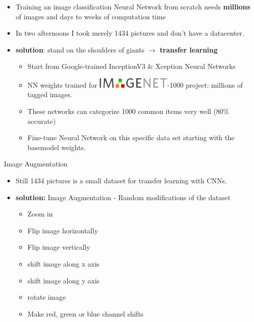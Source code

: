 \documentclass{beamer}
\begin{document}
\begin{frame}
\begin{itemize}
 \item Training an image classification Neural Network from scratch needs \textbf{millions} of images and days to weeks of computation time 
 \item In two afternoons I took merely 1434 pictures and don't have a datacenter.
 \item \textbf{solution}: stand on the shoulders of giants $\rightarrow$ \textbf{transfer learning}
  \begin{itemize}
    \item Start from Google-trained InceptionV3 \& Xception Neural Networks
    \item NN weights trained for \includegraphics[width=0.3\textwidth]{imagenet.jpg}-1000 project: millions of tagged images.
    \item These networks can categorize 1000 common items very well (80\% accurate)
    \item Fine-tune Neural Network on this specific data set starting with the basemodel weights.
  \end{itemize}
\end{itemize}
\end{frame}

\begin{frame}{Image Augmentation}
\begin{itemize}
  \item Still 1434 pictures is a small dataset for transfer learning with CNNs. 
  \item \textbf{solution:} Image Augmentation - Random modifications of the dataset
  \begin{itemize}
	\item Zoom in
	\item Flip image horizontally 
	\item Flip image vertically 
	\item shift image along x axis
	\item shift image along y axis
	\item rotate image 
	\item Make red, green or blue channel shifts
  \end{itemize}
\end{itemize}
\end{frame}
\end{document}
